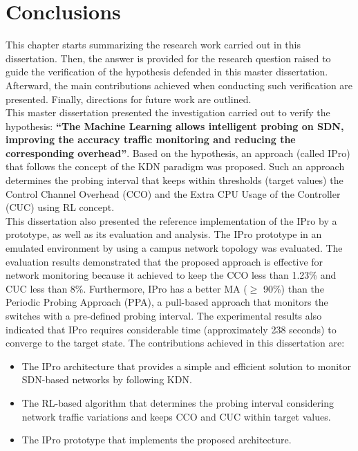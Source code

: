 \chapter{Conclusions}
This chapter starts summarizing the research work carried out in this dissertation. Then, the answer is provided for the research question raised to guide the verification of the hypothesis defended in this master dissertation. Afterward, the main contributions achieved when conducting such verification are presented. Finally, directions for future work are outlined.\\

This master dissertation presented the investigation carried out to verify the hypothesis: \textbf{``The Machine Learning allows intelligent probing on SDN, improving the accuracy traffic monitoring and reducing the corresponding overhead''}. Based on the hypothesis, an approach (called IPro) that follows the concept of the KDN paradigm was proposed. Such an approach determines the probing interval that keeps within thresholds (target values) the Control Channel Overhead (CCO) and the Extra CPU Usage of the Controller (CUC) using RL concept. \\

This dissertation also presented the reference implementation of the IPro by a prototype, as well as its evaluation and analysis. The IPro prototype in an emulated environment  by using a campus network topology was evaluated. The evaluation results demonstrated that the proposed approach is effective for network monitoring because it achieved to keep the CCO less than 1.23\% and CUC less than 8\%. Furthermore, IPro has a better MA  ($\geq$ 90\%) than the Periodic Probing Approach (PPA), a pull-based approach that monitors the switches with a pre-defined probing interval. The experimental results also indicated that IPro requires considerable time (approximately 238 seconds) to converge to the target state. The contributions achieved in this dissertation are:

 \begin{itemize}
     \item The IPro architecture that provides a simple and efficient solution to monitor SDN-based networks by following KDN.
     \item The RL-based algorithm that determines the probing interval considering network traffic variations and keeps CCO and CUC within target values.
     \item The IPro prototype that implements the proposed architecture.
 \end{itemize}{}

